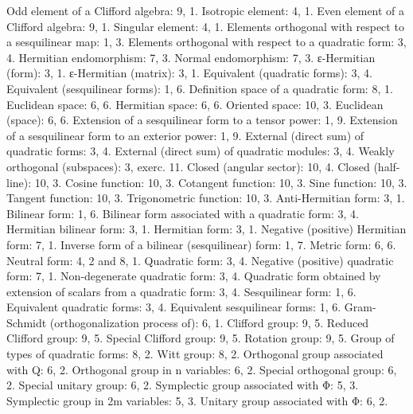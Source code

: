 Odd element of a Clifford algebra: 9, 1. Isotropic element: 4, 1. Even element of a Clifford algebra: 9, 1. Singular element: 4, 1. Elements orthogonal with respect to a sesquilinear map: 1, 3. Elements orthogonal with respect to a quadratic form: 3, 4. Hermitian endomorphism: 7, 3. Normal endomorphism: 7, 3. ε-Hermitian (form): 3, 1. ε-Hermitian (matrix): 3, 1. Equivalent (quadratic forms): 3, 4. Equivalent (sesquilinear forms): 1, 6. Definition space of a quadratic form: 8, 1. Euclidean space: 6, 6. Hermitian space: 6, 6. Oriented space: 10, 3. Euclidean (space): 6, 6. Extension of a sesquilinear form to a tensor power: 1, 9. Extension of a sesquilinear form to an exterior power: 1, 9. External (direct sum) of quadratic forms: 3, 4. External (direct sum) of quadratic modules: 3, 4. Weakly orthogonal (subspaces): 3, exerc. 11. Closed (angular sector): 10, 4. Closed (half-line): 10, 3. Cosine function: 10, 3. Cotangent function: 10, 3. Sine function: 10, 3. Tangent function: 10, 3. Trigonometric function: 10, 3. Anti-Hermitian form: 3, 1. Bilinear form: 1, 6. Bilinear form associated with a quadratic form: 3, 4. Hermitian bilinear form: 3, 1. Hermitian form: 3, 1. Negative (positive) Hermitian form: 7, 1. Inverse form of a bilinear (sesquilinear) form: 1, 7. Metric form: 6, 6. Neutral form: 4, 2 and 8, 1. Quadratic form: 3, 4. Negative (positive) quadratic form: 7, 1. Non-degenerate quadratic form: 3, 4. Quadratic form obtained by extension of scalars from a quadratic form: 3, 4. Sesquilinear form: 1, 6. Equivalent quadratic forms: 3, 4. Equivalent sesquilinear forms: 1, 6. Gram-Schmidt (orthogonalization process of): 6, 1. Clifford group: 9, 5. Reduced Clifford group: 9, 5. Special Clifford group: 9, 5. Rotation group: 9, 5. Group of types of quadratic forms: 8, 2. Witt group: 8, 2. Orthogonal group associated with Q: 6, 2. Orthogonal group in n variables: 6, 2. Special orthogonal group: 6, 2. Special unitary group: 6, 2. Symplectic group associated with Φ: 5, 3. Symplectic group in 2m variables: 5, 3. Unitary group associated with Φ: 6, 2.

